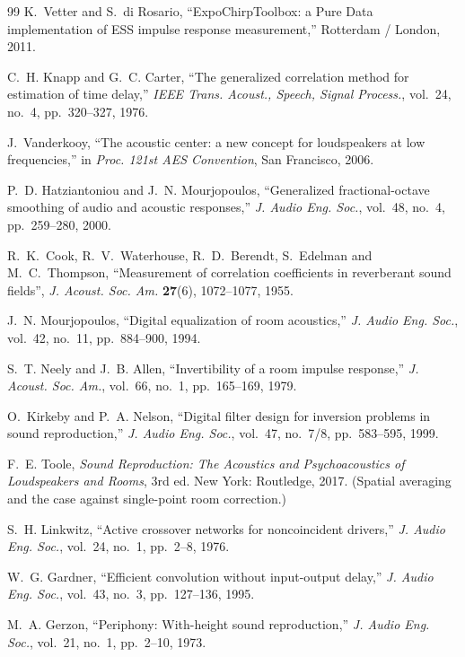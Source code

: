 \begin{thebibliography}{99}
K.~Vetter and S.~di Rosario, ``ExpoChirpToolbox: a Pure Data implementation of
ESS impulse response measurement,'' Rotterdam / London, 2011.

C.~H. Knapp and G.~C. Carter, ``The generalized correlation method for
estimation of time delay,'' \textit{IEEE Trans. Acoust., Speech, Signal
Process.}, vol.~24, no.~4, pp.~320--327, 1976.

J.~Vanderkooy, ``The acoustic center: a new concept for loudspeakers at low
frequencies,'' in \textit{Proc. 121st AES Convention}, San Francisco, 2006.

P.~D. Hatziantoniou and J.~N. Mourjopoulos, ``Generalized fractional-octave
smoothing of audio and acoustic responses,'' \textit{J. Audio Eng. Soc.},
vol.~48, no.~4, pp.~259--280, 2000.

R.~K.~Cook, R.~V.~Waterhouse, R.~D.~Berendt, S.~Edelman and M.~C.~Thompson,
``Measurement of correlation coefficients in reverberant sound fields'',
\emph{J. Acoust. Soc. Am.} \textbf{27}(6), 1072--1077, 1955.

J.~N. Mourjopoulos, ``Digital equalization of room acoustics,''
\textit{J. Audio Eng. Soc.}, vol.~42, no.~11, pp.~884--900, 1994.

S.~T. Neely and J.~B. Allen, ``Invertibility of a room impulse response,''
\textit{J. Acoust. Soc. Am.}, vol.~66, no.~1, pp.~165--169, 1979.

O.~Kirkeby and P.~A. Nelson, ``Digital filter design for inversion problems in
sound reproduction,'' \textit{J. Audio Eng. Soc.}, vol.~47, no.~7/8,
pp.~583--595, 1999.

F.~E. Toole, \textit{Sound Reproduction: The Acoustics and Psychoacoustics of
Loudspeakers and Rooms}, 3rd ed. New York: Routledge, 2017. (Spatial averaging
and the case against single-point room correction.)

S.~H. Linkwitz, ``Active crossover networks for noncoincident drivers,''
\textit{J. Audio Eng. Soc.}, vol.~24, no.~1, pp.~2--8, 1976.

W.~G. Gardner, ``Efficient convolution without input-output delay,''
\textit{J. Audio Eng. Soc.}, vol.~43, no.~3, pp.~127--136, 1995.

M.~A. Gerzon, ``Periphony: With-height sound reproduction,''
\textit{J. Audio Eng. Soc.}, vol.~21, no.~1, pp.~2--10, 1973.


\end{thebibliography}
